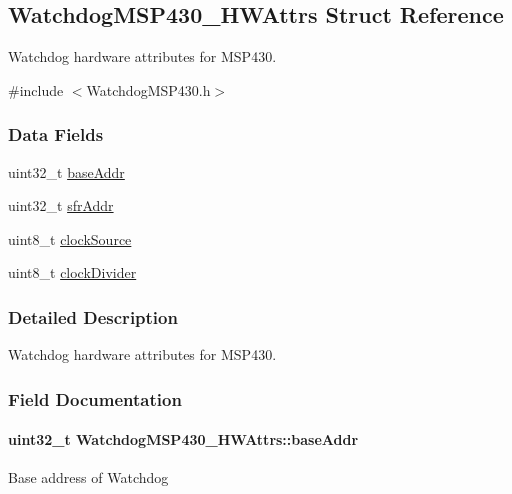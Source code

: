 \subsection{Watchdog\-M\-S\-P430\-\_\-\-H\-W\-Attrs Struct Reference}
\label{struct_watchdog_m_s_p430___h_w_attrs}


Watchdog hardware attributes for M\-S\-P430.  




{\ttfamily \#include $<$Watchdog\-M\-S\-P430.\-h$>$}

\subsubsection*{Data Fields}
\begin{DoxyCompactItemize}
\item 
uint32\-\_\-t \hyperlink{struct_watchdog_m_s_p430___h_w_attrs_a7a54ffaf26e1afc7ea3c1c65b1e24262}{base\-Addr}
\item 
uint32\-\_\-t \hyperlink{struct_watchdog_m_s_p430___h_w_attrs_a763f95534b160827a7c199ddab02a6b9}{sfr\-Addr}
\item 
uint8\-\_\-t \hyperlink{struct_watchdog_m_s_p430___h_w_attrs_a7b0d9bd3ef04e58530c19312621b05a2}{clock\-Source}
\item 
uint8\-\_\-t \hyperlink{struct_watchdog_m_s_p430___h_w_attrs_a405ce3d2556166a841de62f207ce8675}{clock\-Divider}
\end{DoxyCompactItemize}


\subsubsection{Detailed Description}
Watchdog hardware attributes for M\-S\-P430. 

\subsubsection{Field Documentation}
\paragraph[{base\-Addr}]{\setlength{\rightskip}{0pt plus 5cm}uint32\-\_\-t Watchdog\-M\-S\-P430\-\_\-\-H\-W\-Attrs\-::base\-Addr}\label{struct_watchdog_m_s_p430___h_w_attrs_a7a54ffaf26e1afc7ea3c1c65b1e24262}
Base address of Watchdog 
